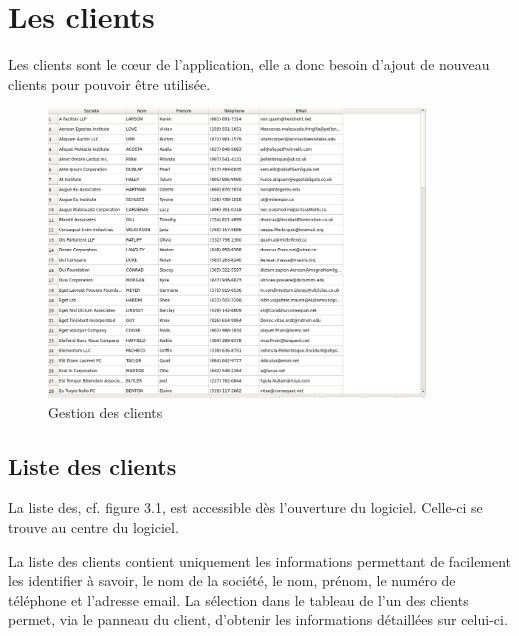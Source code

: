 \chapter{Les clients}
Les clients sont le cœur de l'application, elle a donc besoin d'ajout de nouveau clients pour pouvoir être utilisée. 
\begin{figure}[H]
	\centering
	\includegraphics[width=10cm]{screens/clients.png}
	\caption{Gestion des clients}
\end{figure}

\section{Liste des clients}
La liste des, cf. figure 3.1, est accessible dès l’ouverture du logiciel. Celle-ci se trouve au centre du logiciel. 

La liste des clients contient uniquement les informations permettant de facilement les identifier à savoir, le nom de la société, le nom,
prénom, le numéro de téléphone et l’adresse email. La sélection dans le tableau de l’un des clients permet, via le panneau du client,
d’obtenir les informations détaillées sur celui-ci. 

